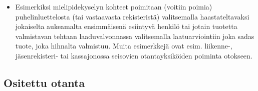 \documentclass[
]{book}
\providecommand{\tightlist}{%
  \setlength{\itemsep}{0pt}\setlength{\parskip}{0pt}}
\begin{document}
\begin{itemize}
  \begin{itemize}
  \tightlist
  \item
    Esimerkiksi mielipidekyselyn kohteet poimitaan (voitiin poimia) puhelinluettelosta (tai vastaavasta rekisteristä) valitsemalla haastateltavaksi jokaiselta aukeamalta ensimmäisenä esiintyvä henkilö tai jotain tuotetta valmistavan tehtaan laaduvalvonnassa valitsemalla laatuarviointiin joka sadas tuote, joka hihnalta valmistuu. Muita esimerkkejä ovat esim. liikenne-, jäsenrekisteri- tai kassajonossa seisovien otantayksiköiden poiminta otokseen.
  \end{itemize}
\end{itemize}

\hypertarget{ositettu-otanta}{%
\subsection{Ositettu otanta}\label{ositettu-otanta}}
\end{document}
